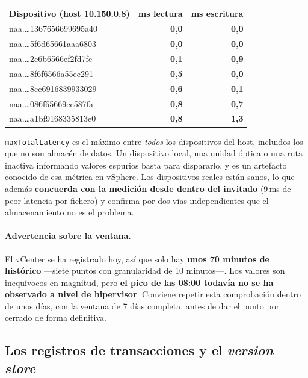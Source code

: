 \documentclass[11pt,a4paper]{article}
\newcommand{\cod}[1]{\texttt{\small #1}}
\newcommand{\bien}[1]{\textcolor{verde}{\textbf{#1}}}
\begin{document}
\begin{table}[h]
\centering
\small
\begin{tabular}{lrr}
\toprule
\textbf{Dispositivo (host 10.150.0.8)} & \textbf{ms lectura} & \textbf{ms escritura} \\
\midrule
naa.\ldots 1367656699695a40 & \bien{0,0} & \bien{0,0} \\
naa.\ldots 5f6d65661aaa6803 & \bien{0,0} & \bien{0,0} \\
naa.\ldots 2c6b6566ef2fd7fe & \bien{0,1} & \bien{0,9} \\
naa.\ldots 8f6f6566a55ec291 & \bien{0,5} & \bien{0,0} \\
naa.\ldots 8ec6916839933029 & \bien{0,6} & \bien{0,1} \\
naa.\ldots 086f65669cc587fa & \bien{0,8} & \bien{0,7} \\
naa.\ldots a1bf9168335813e0 & \bien{0,8} & \bien{1,3} \\
\bottomrule
\end{tabular}
\end{table}

\cod{maxTotalLatency} es el máximo entre \emph{todos} los dispositivos del
host, incluidos los que no son almacén de datos. Un dispositivo local, una
unidad óptica o una ruta inactiva informando valores espurios basta para
dispararlo, y es un artefacto conocido de esa métrica en vSphere. Los
dispositivos reales están sanos, lo que además \textbf{concuerda con la
medición desde dentro del invitado} (9\,ms de peor latencia por fichero) y
confirma por dos vías independientes que el almacenamiento no es el problema.

\paragraph{Advertencia sobre la ventana.} El vCenter se ha registrado hoy, así
que solo hay \textbf{unos 70 minutos de histórico} —siete puntos con
granularidad de 10 minutos—. Los valores son inequívocos en magnitud, pero
\textbf{el pico de las 08:00 todavía no se ha observado a nivel de
hipervisor}. Conviene repetir esta comprobación dentro de unos días, con la
ventana de 7 días completa, antes de dar el punto por cerrado de forma
definitiva.

\subsection{Los registros de transacciones y el \emph{version store}}
\end{document}
